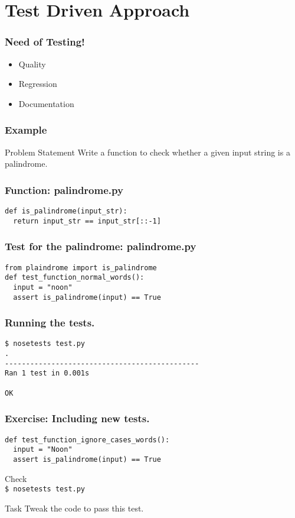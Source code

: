 \documentclass[compress,14pt]{beamer}
\newcommand{\emphbar}[1]
{\begin{beamercolorbox}[rounded=true]{emphbar} 
      {#1}
 \end{beamercolorbox}
}
\newcommand{\PythonCode}[1]{\lstinline{#1}}
\begin{document}
\section{Test Driven Approach}
\begin{frame}
    \frametitle{Need of Testing!}
   
    \begin{itemize}
        \item Quality
        \item Regression
        \item Documentation
    \end{itemize}
\end{frame}

\begin{frame}[fragile]
    \frametitle{Example}
    \begin{block}{Problem Statement}
      Write a function to check whether a given input
      string is a palindrome.
    \end{block}
\end{frame}

\begin{frame}[fragile]
    \frametitle{Function: palindrome.py}
\begin{lstlisting}    
def is_palindrome(input_str):
  return input_str == input_str[::-1]
\end{lstlisting}    
\end{frame}

\begin{frame}[fragile]
    \frametitle{Test for the palindrome: palindrome.py}
\begin{lstlisting}    
from plaindrome import is_palindrome
def test_function_normal_words():
  input = "noon"
  assert is_palindrome(input) == True
\end{lstlisting}    
\end{frame}

\begin{frame}[fragile]
    \frametitle{Running the tests.}
\begin{lstlisting}    
$ nosetests test.py 
.
----------------------------------------------
Ran 1 test in 0.001s

OK
\end{lstlisting}    
\end{frame}

\begin{frame}[fragile]
    \frametitle{Exercise: Including new tests.}
\begin{lstlisting}    
def test_function_ignore_cases_words():
  input = "Noon"
  assert is_palindrome(input) == True
\end{lstlisting}
     \vspace*{0.25in}
     Check\\
     \PythonCode{$ nosetests test.py} \\
     \begin{block}{Task}
     Tweak the code to pass this test.
     \end{block}
\end{frame}
\end{document}
